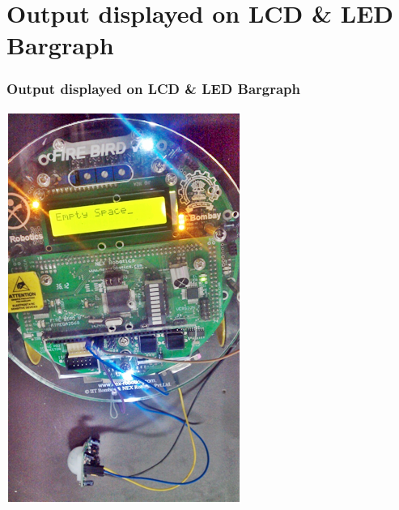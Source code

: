 \documentclass[table,10pt,red]{beamer}	%
\begin{document}

\section{Output displayed on LCD \& LED Bargraph} %

\begin{frame}
	\frametitle{Output displayed on LCD \& LED Bargraph}
\pause
\hspace{0mm}
	\begin{minipage}[c]{0.49\textwidth}
\includegraphics[width=0.8\linewidth]{out1.png}
	\end{minipage}
	\begin{minipage}[c]{0.49\textwidth}

\end{minipage}
\end{frame}
\end{document}
